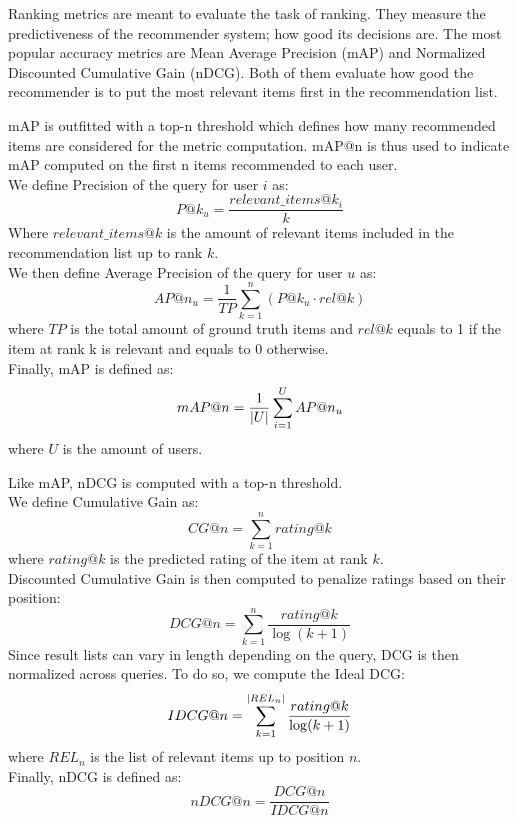 Ranking metrics are meant to evaluate the task of ranking. They measure the predictiveness of the recommender system; how good its decisions are. The most popular accuracy metrics are Mean Average Precision (mAP) and Normalized Discounted Cumulative Gain (nDCG). Both of them evaluate how good the recommender is to put the most relevant items first in the recommendation list.\par
mAP is outfitted with a top-n threshold which defines how many recommended items are considered for the metric computation. mAP@n is thus used to indicate mAP computed on the first n items recommended to each user.\\
We define Precision of the query for user $i$ as:
\begin{equation*}
P@k_u = \frac{relevant\_items@k_i}{k}
\end{equation*}
Where $relevant\_items@k$ is the amount of relevant items included in the recommendation list up to rank $k$.\\
We then define Average Precision of the query for user $u$ as:
\begin{equation*}
AP@n_u = \frac{1}{TP} \sum_{k=1}^{n} (P@k_u \cdot rel@k)
\end{equation*}
where $TP$ is the total amount of ground truth items and $rel@k$ equals to 1 if the item at rank k is relevant and equals to 0 otherwise.\\
Finally, mAP is defined as:
\begin{equation*}
mAP@n = \frac{1}{\left\lvert U\right\rvert} \sum_{i=1}^{U} AP@n_u
\end{equation*}
where $U$ is the amount of users.\par
Like mAP, nDCG is computed with a top-n threshold.\\
We define Cumulative Gain as:
\begin{equation*}
CG@n = \sum_{k=1}^{n} rating@k
\end{equation*}
where $rating@k$ is the predicted rating of the item at rank $k$.\\
Discounted Cumulative Gain is then computed to penalize ratings based on their position:
\begin{equation*}
DCG@n = \sum_{k=1}^{n} \frac{rating@k}{\log(k+1)}
\end{equation*}
Since result lists can vary in length depending on the query, DCG is then normalized across queries. To do so, we compute the Ideal DCG:
\begin{equation*}
IDCG@n = \sum_{k=1}^{\left\lvert REL_n\right\rvert} \frac{rating@k}{\log(k+1)}
\end{equation*}
where $REL_n$ is the list of relevant items up to position $n$.\\
Finally, nDCG is defined as:
\begin{equation*}
nDCG@n = \frac{DCG@n}{IDCG@n}
\end{equation*}


